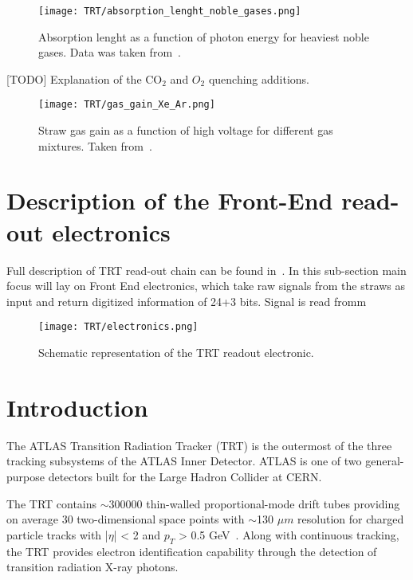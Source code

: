 \begin{figure}
\centering
\texttt{[image: TRT/absorption\_lenght\_noble\_gases.png]}
\caption{ 
  Absorption lenght as a function of photon energy for heaviest noble gases. Data was taken from~\cite{Hubbell:353989}.
}
\label{fig:absorption_lenght}
\end{figure}

[TODO] Explanation of the CO$_{2}$ and $O_2$ quenching additions.

\begin{figure}
\centering
\texttt{[image: TRT/gas\_gain\_Xe\_Ar.png]}
\caption{ 
Straw gas gain as a function of high voltage for different gas mixtures. Taken from~\cite{Abat:2008zza}.
}
\label{fig:gas_gain}
\end{figure}


\section{Description of the Front-End read-out electronics}
\label{subsec:front_end_electronics}


Full description of TRT read-out chain can be found in~\cite{TRT_electronics}.
In this sub-section main focus will lay on Front End electronics, which take raw signals from the straws as input and return digitized information of 24+3 bits.
Signal is read fromm 


\begin{figure}
\centering
\texttt{[image: TRT/electronics.png]}
\caption{ 
 Schematic representation of the TRT readout electronic.
}
\label{fig:electronics}
\end{figure}



\section{Introduction}
\label{sec:TRT:introduction}




The ATLAS Transition Radiation Tracker (TRT) is the outermost of the three tracking subsystems of the ATLAS Inner Detector. 
ATLAS is one of two general-purpose detectors built for the Large Hadron Collider at CERN.

The TRT contains $\sim$300000 thin-walled proportional-mode drift tubes providing on average 30 two-dimensional 
space points with $\sim$130 $\mu m$ resolution for charged particle tracks with |$\eta$| < 2 and $p_T$ > 0.5 GeV~\cite{Abat:2008zza,Abat:2008zzb,Abat:2008zz}.
Along with continuous tracking, the TRT provides electron identification capability through the detection of transition radiation X-ray photons.

